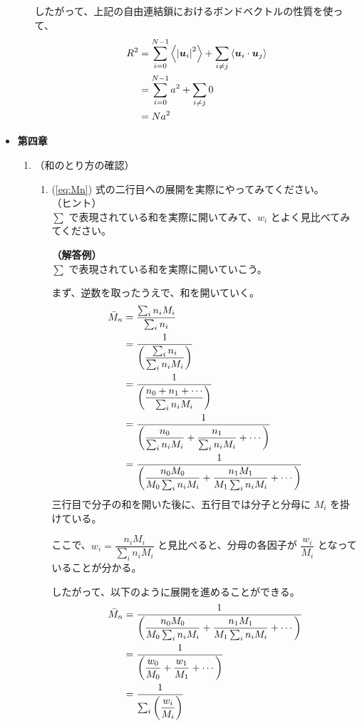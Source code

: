 \documentclass[a4paper,11pt]{ltjsarticle}
\begin{document}
\begin{itemize}
\begin{enumerate}
	したがって、上記の自由連結鎖におけるボンドベクトルの性質を使って、
	\begin{align*}
	R^2
	&=\sum_{i=0}^{N-1} \left\langle \left|\bm{u}_i \right|^2 \right\rangle 
	+\sum_{i \neq j} \left\langle \bm{u}_i \cdot \bm{u}_j \right\rangle \notag \\
	&=\sum_{i=0}^{N-1} a^2 + \sum_{i \neq j} 0 \notag \\
	&= N a^2
	\end{align*}
	\end{enumerate}

\item
{\bf 第四章}
	\begin{enumerate}
	\item
	（和のとり方の確認）\\
		\vspace{-5mm}
		\begin{enumerate}
		\item
		(\ref{eq:Mn}) 式の二行目への展開を実際にやってみてください。\\
		（ヒント）\\
		$\sum$ で表現されている和を実際に開いてみて、$w_i$ とよく見比べてみてください。

		{\bf（解答例）}\\
		$\sum$ で表現されている和を実際に開いていこう。

		まず、逆数を取ったうえで、和を開いていく。
		\begin{align*}
		{\bar M}_n 
			&= \dfrac{\sum_i n_i M_i}{\sum_i n_i} \notag \\
			&= \dfrac{1}{\left( \dfrac{\sum_i n_i}{\sum_i n_i M_i} \right)} \notag \\
			&= \dfrac{1}{\left(\dfrac{n_0 + n_1 + \cdots}{\sum_i n_i M_i} \right)} \notag \\
			&= \dfrac{1}{\left(\dfrac{n_0 }{\sum_i n_i M_i} + \dfrac{n_1}{\sum_i n_i M_i} + \cdots \right)} \notag \\
			&= \dfrac{1}{\left(\dfrac{n_0 M_0}{M_0 \sum_i n_i M_i} + \dfrac{n_1 M_1}{M_1\sum_i n_i M_i} + \cdots \right)}
		\end{align*}
		三行目で分子の和を開いた後に、五行目では分子と分母に $M_i$ を掛けている。

		ここで、$w_i =\dfrac{n_i M_i}{\sum_i n_i M_i}$ と見比べると、分母の各因子が $\dfrac{w_i}{M_i}$ となっていることが分かる。

		したがって、以下のように展開を進めることができる。
		\begin{align*}
		{\bar M}_n 
			&= \dfrac{1}{\left(\dfrac{n_0 M_0}{M_0 \sum_i n_i M_i} + \dfrac{n_1 M_1}{M_1\sum_i n_i M_i} + \cdots \right)} \notag \\
			&= \dfrac{1}{\left(\dfrac{w_0}{M_0} + \dfrac{w_1}{M_1} + \cdots \right)} \notag \\
			&= \dfrac{1}{\sum_i \left(\dfrac{w_i}{M_i} \right)}
		\end{align*}


\end{enumerate}
\end{enumerate}
\end{itemize}
\end{document}
